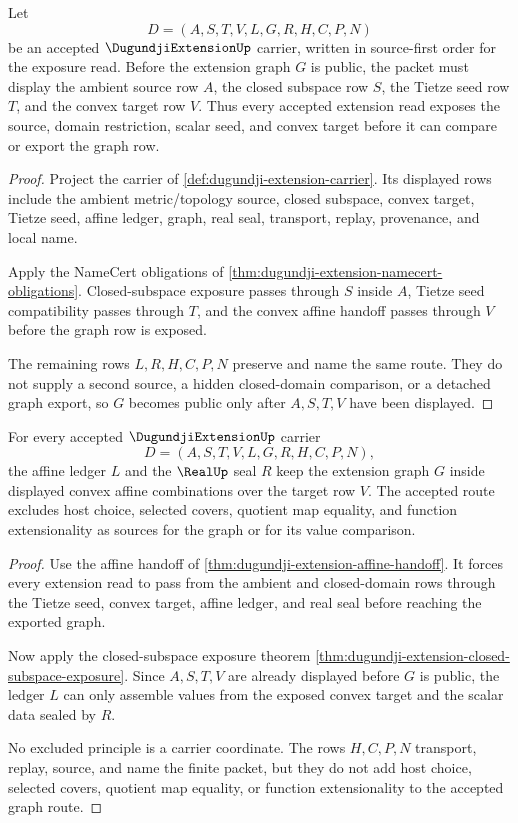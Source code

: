 \begin{theorem}
\label{thm:dugundji-extension-closed-subspace-exposure}
Let
$$
D=(A,S,T,V,L,G,R,H,C,P,N)
$$
be an accepted $\DugundjiExtensionUp$ carrier, written in source-first order for the exposure read. Before the extension graph $G$ is public, the packet must display the ambient source row $A$, the closed subspace row $S$, the Tietze seed row $T$, and the convex target row $V$. Thus every accepted extension read exposes the source, domain restriction, scalar seed, and convex target before it can compare or export the graph row.
\end{theorem}
\begin{proof}
Project the carrier of \autoref{def:dugundji-extension-carrier}. Its displayed rows include the ambient metric/topology source, closed subspace, convex target, Tietze seed, affine ledger, graph, real seal, transport, replay, provenance, and local name.

Apply the NameCert obligations of \autoref{thm:dugundji-extension-namecert-obligations}. Closed-subspace exposure passes through $S$ inside $A$, Tietze seed compatibility passes through $T$, and the convex affine handoff passes through $V$ before the graph row is exposed.

The remaining rows $L,R,H,C,P,N$ preserve and name the same route. They do not supply a second source, a hidden closed-domain comparison, or a detached graph export, so $G$ becomes public only after $A,S,T,V$ have been displayed.
\end{proof}

\begin{theorem}
\label{thm:dugundji-extension-convex-affine-nonescape}
For every accepted $\DugundjiExtensionUp$ carrier
$$
D=(A,S,T,V,L,G,R,H,C,P,N),
$$
the affine ledger $L$ and the $\RealUp$ seal $R$ keep the extension graph $G$ inside displayed convex affine combinations over the target row $V$. The accepted route excludes host choice, selected covers, quotient map equality, and function extensionality as sources for the graph or for its value comparison.
\end{theorem}
\begin{proof}
Use the affine handoff of \autoref{thm:dugundji-extension-affine-handoff}. It forces every extension read to pass from the ambient and closed-domain rows through the Tietze seed, convex target, affine ledger, and real seal before reaching the exported graph.

Now apply the closed-subspace exposure theorem \autoref{thm:dugundji-extension-closed-subspace-exposure}. Since $A,S,T,V$ are already displayed before $G$ is public, the ledger $L$ can only assemble values from the exposed convex target and the scalar data sealed by $R$.

No excluded principle is a carrier coordinate. The rows $H,C,P,N$ transport, replay, source, and name the finite packet, but they do not add host choice, selected covers, quotient map equality, or function extensionality to the accepted graph route.
\end{proof}

